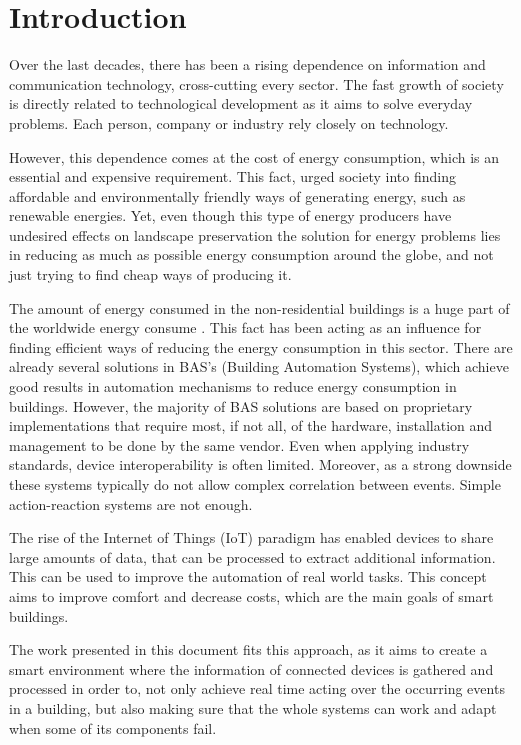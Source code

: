 

\chapter{Introduction}
\label{chapter:introduction}

Over the last decades, there has been a rising dependence on information and communication technology, cross-cutting every sector. The fast growth of society is directly related to technological development as it aims to solve everyday problems. Each person, company or industry rely closely on technology.

However, this dependence comes at the cost of energy consumption, which is an essential and expensive requirement. This fact, urged society into finding affordable and environmentally friendly ways of generating energy, such as renewable energies. Yet, even though this type of energy producers have undesired effects on landscape preservation the solution for energy problems lies in reducing as much as possible energy consumption around the globe, and not just trying to find cheap ways of producing it.


The amount of energy consumed in the non-residential buildings is a huge part of the worldwide energy consume \cite{Nolte2011}. This fact has been acting as an influence for finding efficient ways of reducing the energy consumption in this sector. There are already several solutions in BAS’s (Building Automation Systems), which achieve good results in automation mechanisms to reduce energy consumption in buildings. However, the majority of BAS solutions are based on proprietary implementations that require most, if not all, of the hardware, installation and management to be done by the same vendor. Even when applying industry standards, device interoperability is often limited. Moreover, as a strong downside these systems typically do not allow complex correlation between events. Simple action-reaction systems are not enough.

The rise of the Internet of Things (IoT) paradigm has enabled devices to share large amounts of data, that can be processed to extract additional information. This can be used to improve the automation of real world tasks. This concept aims to improve comfort and decrease costs, which are the main goals of smart buildings.

The work presented in this document fits this approach, as it aims to create a smart environment where the information of connected devices is gathered and processed in order to, not only achieve real time acting over the occurring events in a building, but also making sure that the whole systems can work and adapt when some of its components fail.


